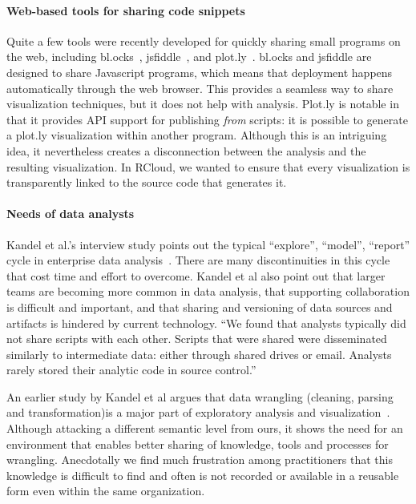 \paragraph*{Web-based tools for sharing code snippets}
Quite a few tools were recently developed for quickly
sharing small programs on the web, including
bl.ocks~\cite{blocks}, jsfiddle~\cite{jsfiddle}, and
plot.ly~\cite{plotly}. bl.ocks and jsfiddle are designed to
share Javascript programs, which means that deployment happens
automatically through the web browser. This provides a seamless
way to share visualization techniques, but it does not help with
analysis.
Plot.ly is notable in that it
provides API support for publishing \emph{from} scripts: 
it is possible to generate a plot.ly visualization within
another program. Although this is an intriguing idea, it
nevertheless creates a disconnection between the analysis and the
resulting visualization. In RCloud, we wanted to ensure that every
visualization is transparently linked to the source code that
generates it.

\paragraph*{Needs of data analysts}
Kandel et al.'s interview study points out the typical ``explore'',
``model'', ``report'' cycle in enterprise data
analysis~\cite{Kandel:2012:EDA}. There are many discontinuities in
this cycle that cost time and effort to overcome.
Kandel et al also point out that larger teams
are becoming more common in data analysis, that supporting
collaboration is difficult and important, and that sharing
and versioning of data sources and artifacts is hindered by current
technology. ``We found that analysts typically did not
share scripts with each other. Scripts that were shared were
disseminated similarly to intermediate data: either through shared
drives or email. Analysts rarely stored their analytic code in source
control.''

An earlier study by Kandel et al argues that data wrangling
(cleaning, parsing and transformation)is a major part of exploratory
analysis and visualization~\cite{Kandel:2011:RDI}.
Although attacking a different semantic level from ours, it shows
the need for an environment that enables better sharing
of knowledge, tools and processes for wrangling. Anecdotally
we find much frustration among practitioners that this knowledge
is difficult to find and often is not recorded or available in a
reusable form even within the same organization.

